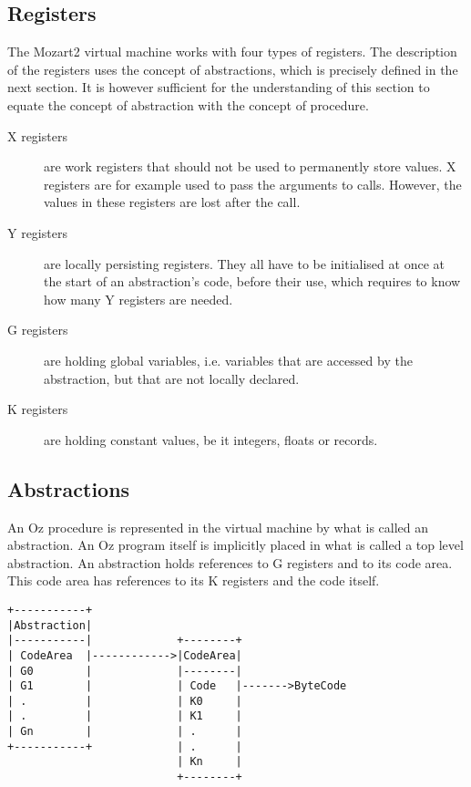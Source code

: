 \documentclass[a4paper]{memoir}
\begin{document}
\subsection{Registers}\label{sec:intro:registers}
The Mozart2 virtual machine works with four types of registers. The description of the registers uses the concept of abstractions, which is precisely defined in the next section. It is however sufficient for the understanding of this section to equate the concept of abstraction with the concept of procedure.
\begin{description}
  \item[X registers]are work registers that should not be used to permanently
    store values. X registers are for example used to pass the arguments to calls. However, the values in these registers are lost after the call. %
  \item[Y registers]are locally persisting registers. They all have to be initialised at once at the start of an abstraction's code, before their use, which requires to know how many Y registers are needed.
  \item[G registers] are holding global variables, i.e. variables that are accessed by the abstraction, but that are not locally declared.
  \item[K registers] are holding constant values, be it integers, floats or records.
\end{description}

\subsection{Abstractions}\label{sec:vm:abstractions}
An Oz procedure is represented in the virtual machine by what is called an abstraction. An Oz program itself is implicitly placed in what is called a top level abstraction.
An abstraction holds references to G registers and to its code area. This code area has references to its K registers and the code itself. 
\begin{verbatim}
+-----------+
|Abstraction|
|-----------|             +--------+
| CodeArea  |------------>|CodeArea|
| G0        |             |--------|
| G1        |             | Code   |------->ByteCode
| .         |             | K0     |
| .         |             | K1     |
| Gn        |             | .      |
+-----------+             | .      |
                          | Kn     |
                          +--------+
\end{verbatim}
\end{document}
